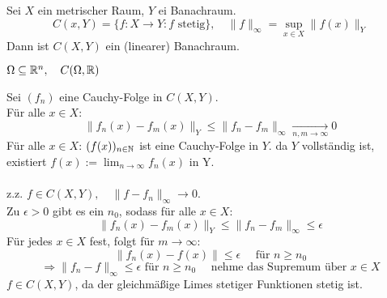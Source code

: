 \begin{prop}
	Sei $X$ ein metrischer Raum, $Y$ ei Banachraum.
	\[ C(x, Y) = \{ f : X \rightarrow Y: f \text{ stetig} \}, \quad \| f \|_{\infty} = \sup_{x \in X} \| f(x) \|_{Y} \]
	Dann ist $C(X, Y)$ ein (linearer) Banachraum.
\end{prop}

\begin{beispiel*}
	$\Omega \subseteq \mathbb{R}^{n}, \quad C(\Omega, \mathbb{R})$
	\begin{beweis}
		Sei $(f_{n})$ eine Cauchy-Folge in $C(X, Y)$. \\
		Für alle $x \in X$:
		\[ \| f_{n}(x) - f_{m}(x) \|_{Y} \leq \| f_{n} - f_{m} \|_{\infty} \xrightarrow[n, m \rightarrow \infty]{} 0 \]
		Für alle $x \in X$: $(f(x))_{n \in \mathbb{N}}$ ist eine Cauchy-Folge in $Y$.
		da $Y$ vollständig ist, existiert $f(x) := \lim_{n \rightarrow \infty} f_{n}(x)$ in Y. \\ \\
		z.z. $f \in C(X, Y), \quad \| f - f_{n} \|_{\infty} \rightarrow 0$. \\
		Zu $\epsilon > 0$ gibt es ein $n_{0}$, sodass für alle $x \in X$:
		\[ \| f_{n}(x) - f_{m}(x) \|_{Y} \leq \| f_{n} - f_{m} \|_{\infty} \leq \epsilon \]
		Für jedes $x \in X$ fest, folgt für $m \rightarrow \infty$:
		 \[ \| f_{n}(x) - f(x) \| \leq \epsilon \quad \text{ für } n \geq n_{0} \]
		 \[ \Rightarrow \| f_{n} - f \|_{\infty} \leq \epsilon \text{ für } n \geq n_{0} \quad  \text{ nehme das Supremum über } x \in X \]
		 $f \in C(X, Y)$, da der gleichmä{\ss}ige Limes stetiger Funktionen stetig ist.
	\end{beweis}
\end{beispiel*}

